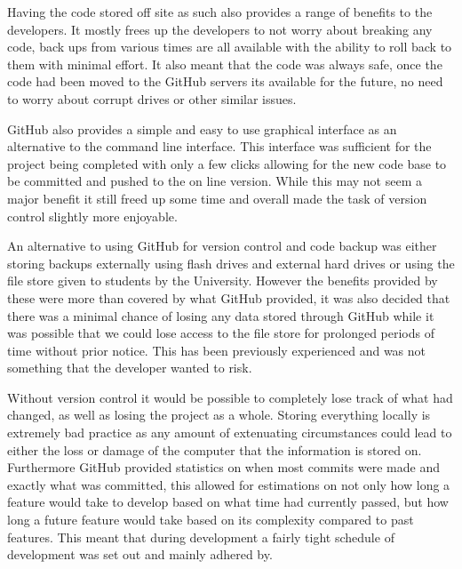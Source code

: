 Having the code stored off site as such also provides a range of benefits to the developers. It mostly frees up the developers to not worry about breaking any code, back ups from various times are all available with the ability to roll back to them with minimal effort. It also meant that the code was always safe, once the code had been moved to the GitHub servers its available for the future, no need to worry about corrupt drives or other similar issues. 

GitHub also provides a simple and easy to use graphical interface as an alternative to the command line interface. This interface was sufficient for the project being completed with only a few clicks allowing for the new code base to be committed and pushed to the on line version. While this may not seem a major benefit it still freed up some time and overall made the task of version control slightly more enjoyable. 

An alternative to using GitHub for version control and code backup was either storing backups externally using flash drives and external hard drives or using the file store given to students by the University. However the benefits provided by these were more than covered by what GitHub provided, it was also decided that there was a minimal chance of losing any data stored through GitHub while it was possible that we could lose access to the file store for prolonged periods of time without prior notice. This has been previously experienced and was not something that the developer wanted to risk.

Without version control it would be possible to completely lose track of what had changed, as well as losing the project as a whole. Storing everything locally is extremely bad practice as any amount of extenuating circumstances could lead to either the loss or damage of the computer that the information is stored on. Furthermore GitHub provided statistics on when most commits were made and exactly what was committed, this allowed for estimations on not only how long a feature would take to develop based on what time had currently passed, but how long a future feature would take based on its complexity compared to past features. This meant that during development a fairly tight schedule of development was set out and mainly adhered by.
